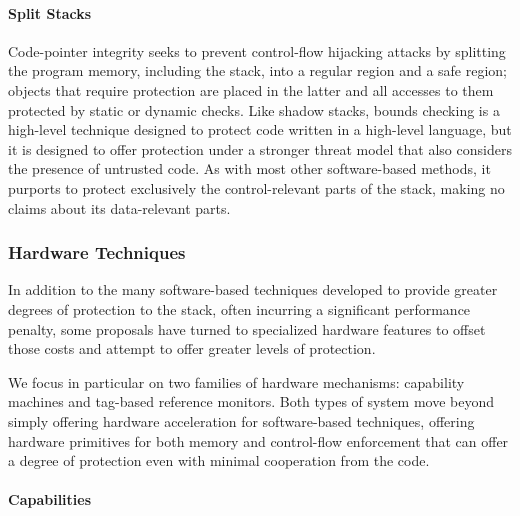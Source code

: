 
\paragraph{Split Stacks}
%
Code-pointer integrity seeks to prevent control-flow hijacking attacks by
splitting the program memory, including the stack, into a regular region and a
safe region; objects that require protection are placed in the latter and
all accesses to them protected by static or dynamic checks.
%
Like shadow stacks, bounds checking is a high-level technique designed to
protect code written in a high-level language, but it is designed to
offer protection under a stronger threat model that also considers the presence
of untrusted code. As with most other software-based methods, it purports to
protect exclusively the control-relevant parts of the stack, making no claims
about its data-relevant parts.

\subsubsection{Hardware Techniques}

In addition to the many software-based techniques developed to provide greater
degrees of protection to the stack, often incurring a significant performance penalty,
some proposals have turned to specialized hardware features to offset those
costs and attempt to offer greater levels of protection.

We focus in particular on two families of hardware mechanisms: capability machines
and tag-based reference monitors. Both types of system move beyond simply
offering hardware acceleration for software-based techniques, offering hardware
primitives for both memory and control-flow enforcement that can offer a degree
of protection even with minimal cooperation from the code.
%

\paragraph{Capabilities}
%

